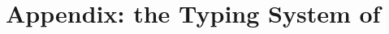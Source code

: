 \documentclass[preprint,nocopyrightspace]{sigplanconf}
\begin{document}

%

{}

\newpage
\appendix 
\section{Appendix: the Typing System of \HOp}
\label{app:types}

\end{document}
